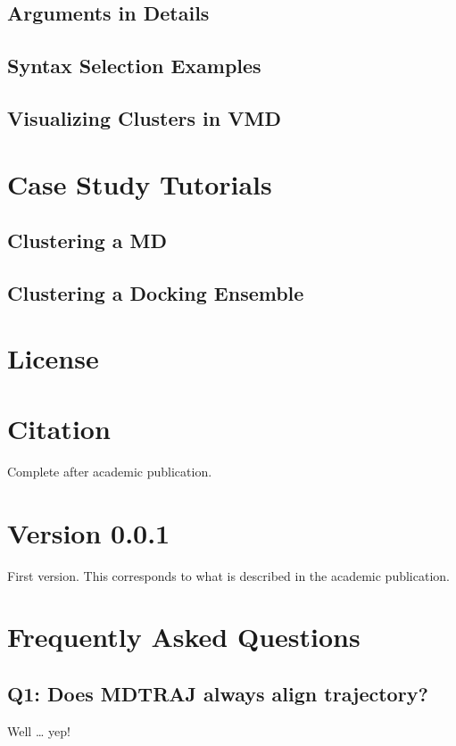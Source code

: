 \documentclass[letterpaper,10pt,english]{sphinxmanual}
\begin{document}
\section{Arguments in Details}
\label{\detokenize{technical:arguments-in-details}}

\section{Syntax Selection Examples}
\label{\detokenize{technical:syntax-selection-examples}}

\section{Visualizing Clusters in VMD}
\label{\detokenize{technical:visualizing-clusters-in-vmd}}

\chapter{Case Study Tutorials}
\label{\detokenize{tutorial:case-study-tutorials}}\label{\detokenize{tutorial::doc}}

\section{Clustering a MD}
\label{\detokenize{tutorial:clustering-a-md}}

\section{Clustering a Docking Ensemble}
\label{\detokenize{tutorial:clustering-a-docking-ensemble}}

\chapter{License}
\label{\detokenize{license:license}}\label{\detokenize{license::doc}}

\chapter{Citation}
\label{\detokenize{citation:citation}}\label{\detokenize{citation::doc}}
Complete after academic publication.


\chapter{Version 0.0.1}
\label{\detokenize{changelog:version-0-0-1}}\label{\detokenize{changelog::doc}}
First version. This corresponds to what is described in the academic publication.


\chapter{Frequently Asked Questions}
\label{\detokenize{faq:frequently-asked-questions}}\label{\detokenize{faq::doc}}

\section{Q1: Does MDTRAJ always align trajectory?}
\label{\detokenize{faq:q1-does-mdtraj-always-align-trajectory}}
Well … yep!



\renewcommand{\indexname}{Index}
\printindex
\end{document}
